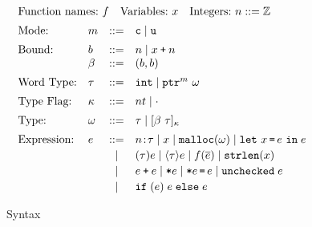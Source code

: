 \begin{figure}
  \small \centering
  $\begin{array}{l}
\begin{array}{lll}
\text{Function names:}~f&
       \text{Variables:}~ x
& \text{Integers:}~n::=\mathbb{Z} 
\end{array}
\\[0.5em]

\begin{array}{llcllcl}

\text{Mode:} & m & ::= & \cmode \mid \umode \\[0.5em]

\text{Bound:} & b & ::= & n \mid x \plus n \\
              & \bvar & ::= & (b,b) \\[0.5em]
  
     \text{Word Type:}& \tau &::=& \tint\mid \tptr{\omega}{m}
\\[0.5em]

\text{Type Flag:}&\kappa &::=& nt \mid \cdot
\\[0.5em]

\text{Type:}&\omega &::=& \tau \mid \tallarrayb{\bvar}{\tau}
\\[0.5em]

\text{Expression:}& e & ::= & 
\evalue{n}{\tau} \mid x \mid \emalloc{\omega} \mid\elet{x}{e}{e} \\[0.2em]
&&\mid&
\ecast{\tau}{e} \mid \edyncast{\tau}{e}\mid \ecall{f}{\overline{e}} \mid \estrlen{x} \\[0.2em]
&&\mid&
\ebinop{e}{e} \mid\estar{e}\mid\eassign{e}{e}\mid\eunchecked{e}
\\[0.2em]
&&\mid&\eif{e}{e}{e}
\end{array}
    \end{array}
  $
  \caption{\lang Syntax}
  \label{fig:checkc-syn}
\end{figure}



